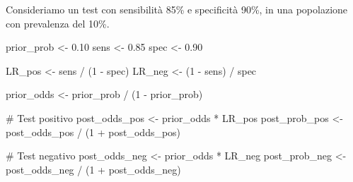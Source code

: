 \documentclass[
  italian,
  letterpaper,
  a4paper,
  11pt,
  open=any]{scrbook}
\newenvironment{Shaded}{\begin{snugshade}}{\end{snugshade}}
\newcommand{\CommentTok}[1]{\textcolor[rgb]{0.37,0.37,0.37}{#1}}
\newcommand{\DecValTok}[1]{\textcolor[rgb]{0.68,0.00,0.00}{#1}}
\newcommand{\FloatTok}[1]{\textcolor[rgb]{0.68,0.00,0.00}{#1}}
\newcommand{\NormalTok}[1]{\textcolor[rgb]{0.00,0.23,0.31}{#1}}
\newcommand{\OtherTok}[1]{\textcolor[rgb]{0.00,0.23,0.31}{#1}}
\newcommand{\SpecialCharTok}[1]{\textcolor[rgb]{0.37,0.37,0.37}{#1}}
\theoremstyle{plain}
\theoremstyle{definition}
\theoremstyle{definition}
\theoremstyle{remark}
\begin{document}
\begin{tcolorbox}[enhanced jigsaw, arc=.35mm, bottomrule=.15mm, bottomtitle=1mm, breakable, colback=white, colbacktitle=quarto-callout-note-color!10!white, colframe=quarto-callout-note-color-frame, coltitle=black, left=2mm, leftrule=.75mm, opacityback=0, opacitybacktitle=0.6, rightrule=.15mm, title=\textcolor{quarto-callout-note-color}{\faInfo}\hspace{0.5em}{Esempio: aggiornamento diagnostico passo per passo}, titlerule=0mm, toprule=.15mm, toptitle=1mm]

Consideriamo un test con sensibilità 85\% e specificità 90\%, in una
popolazione con prevalenza del 10\%.

\begin{Shaded}
\begin{Highlighting}[]
\NormalTok{prior\_prob }\OtherTok{\textless{}{-}} \FloatTok{0.10}
\NormalTok{sens }\OtherTok{\textless{}{-}} \FloatTok{0.85}
\NormalTok{spec }\OtherTok{\textless{}{-}} \FloatTok{0.90}

\NormalTok{LR\_pos }\OtherTok{\textless{}{-}}\NormalTok{ sens }\SpecialCharTok{/}\NormalTok{ (}\DecValTok{1} \SpecialCharTok{{-}}\NormalTok{ spec)}
\NormalTok{LR\_neg }\OtherTok{\textless{}{-}}\NormalTok{ (}\DecValTok{1} \SpecialCharTok{{-}}\NormalTok{ sens) }\SpecialCharTok{/}\NormalTok{ spec}

\NormalTok{prior\_odds }\OtherTok{\textless{}{-}}\NormalTok{ prior\_prob }\SpecialCharTok{/}\NormalTok{ (}\DecValTok{1} \SpecialCharTok{{-}}\NormalTok{ prior\_prob)}

\CommentTok{\# Test positivo}
\NormalTok{post\_odds\_pos }\OtherTok{\textless{}{-}}\NormalTok{ prior\_odds }\SpecialCharTok{*}\NormalTok{ LR\_pos}
\NormalTok{post\_prob\_pos }\OtherTok{\textless{}{-}}\NormalTok{ post\_odds\_pos }\SpecialCharTok{/}\NormalTok{ (}\DecValTok{1} \SpecialCharTok{+}\NormalTok{ post\_odds\_pos)}

\CommentTok{\# Test negativo}
\NormalTok{post\_odds\_neg }\OtherTok{\textless{}{-}}\NormalTok{ prior\_odds }\SpecialCharTok{*}\NormalTok{ LR\_neg}
\NormalTok{post\_prob\_neg }\OtherTok{\textless{}{-}}\NormalTok{ post\_odds\_neg }\SpecialCharTok{/}\NormalTok{ (}\DecValTok{1} \SpecialCharTok{+}\NormalTok{ post\_odds\_neg)}


\end{Highlighting}
\end{Shaded}
\end{tcolorbox}
\end{document}
